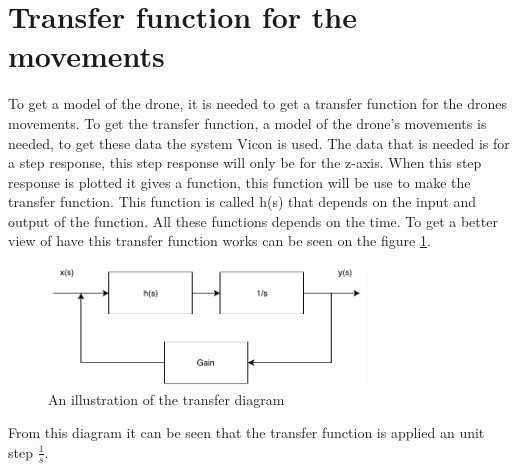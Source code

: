 \section{Transfer function for the movements}\label{s:transfer_function}
To get a model of the drone, it is needed to get a transfer function for the drones movements. To get the transfer function, a model of the drone's movements is needed, to get these data the system Vicon is used. The data that is needed is for a step response, this step response will only be for the z-axis. When this step response is plotted it gives a function, this function will be use to make the transfer function. This function is called h(s)
that depends on the input and output of the function. All these functions depends on the time. To get a better view of have this transfer function works can be seen on the figure \ref{fig:transfer_function}.
\begin{figure}[H]
    \centering
    \includegraphics[width=0.75\textwidth]{figures/ch_design/transfer_function.pdf}
    \caption{An illustration of the transfer diagram}
    \label{fig:transfer_function}
\end{figure}

From this diagram it can be seen that the transfer function is applied an unit step $\frac{1}{s}$. 






